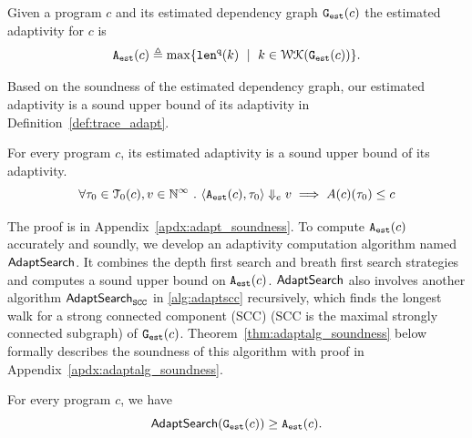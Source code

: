 %
%
%
\begin{defn}
\label{def:prog_adapt}
{
Given a program ${c}$ and its estimated dependency graph 
$\mathtt{{G_{est}}}({c})$
%
the estimated adaptivity for $c$ is 
\[
\progA({c})
\triangleq \max
\left\{ \qlen(k) \ \mid \  k \in \walks(\progG(c))\right \}.
\]
}
\end{defn}
Based on the soundness of the estimated dependency graph, our estimated adaptivity is a sound upper bound of its adaptivity in Definition~\ref{def:trace_adapt}.
\begin{thm}
  \label{thm:adaptfun_sound}
  For every program $c$, 
  its estimated adaptivity is a sound upper bound of its adaptivity.
   \[
   \forall \mathtt{\tau}_0 \in \mathcal{T}_{0}(c), v \in \mathbb{N}^{\infty} ~.~ 
\langle {\ensuremath{\mathtt{A_{est}}}}(c), \mathtt{\tau}_0 \rangle \Downarrow_e v \implies A(c)(\mathtt{\tau}_0) \leq c
\] 
\end{thm}
The proof is in Appendix~\ref{apdx:adapt_soundness}.
%
To compute ${\mathtt{A_{est}}}(c)$ accurately and soundly, we develop an adaptivity computation algorithm named $\mathsf{AdaptSearch}$.
It combines the depth first search and breath first search strategies and computes a sound upper bound on ${\mathtt{A_{est}}}(c)$.
$\mathsf{AdaptSearch}$ also involves another algorithm $\mathsf{AdaptSearch}_{\mathtt{SCC}}$ in \ref{alg:adaptscc} recursively, which finds the longest walk for a strong connected component (SCC) (SCC is the maximal strongly connected subgraph) of $\mathtt{{G_{est}}}(c)$.
Theorem~\ref{thm:adaptalg_soundness} below formally describes the soundness of this algorithm with proof in Appendix~\ref{apdx:adaptalg_soundness}.
\begin{thm}
    \label{thm:adaptalg_soundness}
    For every program $c$, we have
     $$\mathsf{AdaptSearch}(\mathtt{{G_{est}}}({c})) \geq {\ensuremath{\mathtt{A_{est}}}}(c).$$
\end{thm}


